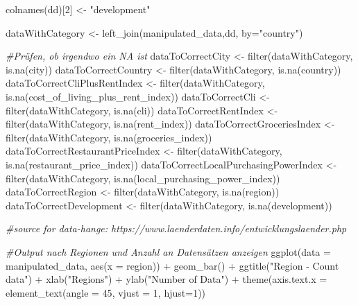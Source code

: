 \documentclass[
  11pt,
  a4paper,
  twoside]{scrbook}
\newenvironment{Shaded}{\begin{snugshade}}{\end{snugshade}}
\newcommand{\AttributeTok}[1]{\textcolor[rgb]{0.77,0.63,0.00}{#1}}
\newcommand{\CommentTok}[1]{\textcolor[rgb]{0.56,0.35,0.01}{\textit{#1}}}
\newcommand{\DecValTok}[1]{\textcolor[rgb]{0.00,0.00,0.81}{#1}}
\newcommand{\FunctionTok}[1]{\textcolor[rgb]{0.00,0.00,0.00}{#1}}
\newcommand{\NormalTok}[1]{#1}
\newcommand{\OtherTok}[1]{\textcolor[rgb]{0.56,0.35,0.01}{#1}}
\newcommand{\SpecialCharTok}[1]{\textcolor[rgb]{0.00,0.00,0.00}{#1}}
\newcommand{\StringTok}[1]{\textcolor[rgb]{0.31,0.60,0.02}{#1}}
\begin{document}
\begin{Shaded}
\begin{Highlighting}[]
\FunctionTok{colnames}\NormalTok{(dd)[}\DecValTok{2}\NormalTok{] }\OtherTok{\textless{}{-}} \StringTok{"development"}

\NormalTok{dataWithCategory }\OtherTok{\textless{}{-}} \FunctionTok{left\_join}\NormalTok{(manipulated\_data,dd, }\AttributeTok{by=}\StringTok{"country"}\NormalTok{)}

\CommentTok{\#Prüfen, ob irgendwo ein \textquotesingle{}NA\textquotesingle{} ist}
\NormalTok{dataToCorrectCity }\OtherTok{\textless{}{-}} \FunctionTok{filter}\NormalTok{(dataWithCategory, }\FunctionTok{is.na}\NormalTok{(city))}
\NormalTok{dataToCorrectCountry }\OtherTok{\textless{}{-}} \FunctionTok{filter}\NormalTok{(dataWithCategory, }\FunctionTok{is.na}\NormalTok{(country))}
\NormalTok{dataToCorrectCliPlusRentIndex }\OtherTok{\textless{}{-}} \FunctionTok{filter}\NormalTok{(dataWithCategory, }\FunctionTok{is.na}\NormalTok{(cost\_of\_living\_plus\_rent\_index))}
\NormalTok{dataToCorrectCli }\OtherTok{\textless{}{-}} \FunctionTok{filter}\NormalTok{(dataWithCategory, }\FunctionTok{is.na}\NormalTok{(cli))}
\NormalTok{dataToCorrectRentIndex }\OtherTok{\textless{}{-}} \FunctionTok{filter}\NormalTok{(dataWithCategory, }\FunctionTok{is.na}\NormalTok{(rent\_index))}
\NormalTok{dataToCorrectGroceriesIndex }\OtherTok{\textless{}{-}} \FunctionTok{filter}\NormalTok{(dataWithCategory, }\FunctionTok{is.na}\NormalTok{(groceries\_index))}
\NormalTok{dataToCorrectRestaurantPriceIndex }\OtherTok{\textless{}{-}} \FunctionTok{filter}\NormalTok{(dataWithCategory, }\FunctionTok{is.na}\NormalTok{(restaurant\_price\_index))}
\NormalTok{dataToCorrectLocalPurchasingPowerIndex }\OtherTok{\textless{}{-}} \FunctionTok{filter}\NormalTok{(dataWithCategory, }\FunctionTok{is.na}\NormalTok{(local\_purchasing\_power\_index))}
\NormalTok{dataToCorrectRegion }\OtherTok{\textless{}{-}} \FunctionTok{filter}\NormalTok{(dataWithCategory, }\FunctionTok{is.na}\NormalTok{(region))}
\NormalTok{dataToCorrectDevelopment }\OtherTok{\textless{}{-}} \FunctionTok{filter}\NormalTok{(dataWithCategory, }\FunctionTok{is.na}\NormalTok{(development))}

\CommentTok{\#source for data{-}hange: https://www.laenderdaten.info/entwicklungslaender.php}



\CommentTok{\#Output nach Regionen und Anzahl an Datensätzen anzeigen}
\FunctionTok{ggplot}\NormalTok{(}\AttributeTok{data =}\NormalTok{ manipulated\_data, }\FunctionTok{aes}\NormalTok{(}\AttributeTok{x =}\NormalTok{ region)) }\SpecialCharTok{+}
  \FunctionTok{geom\_bar}\NormalTok{() }\SpecialCharTok{+}
  \FunctionTok{ggtitle}\NormalTok{(}\StringTok{"Region {-} Count data"}\NormalTok{) }\SpecialCharTok{+}
  \FunctionTok{xlab}\NormalTok{(}\StringTok{"Regions"}\NormalTok{) }\SpecialCharTok{+}
  \FunctionTok{ylab}\NormalTok{(}\StringTok{"Number of Data"}\NormalTok{) }\SpecialCharTok{+}
  \FunctionTok{theme}\NormalTok{(}\AttributeTok{axis.text.x =} \FunctionTok{element\_text}\NormalTok{(}\AttributeTok{angle =} \DecValTok{45}\NormalTok{, }\AttributeTok{vjust =} \DecValTok{1}\NormalTok{, }\AttributeTok{hjust=}\DecValTok{1}\NormalTok{))}
\end{Highlighting}
\end{Shaded}
\end{document}
